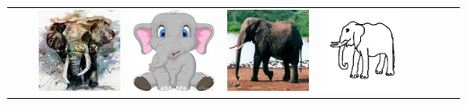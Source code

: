 \begin{table}[htbp]
\begin{tabularx}{\textwidth}{lcYYYYYYYY}
       & & \includegraphics[height=\imagequadsize, width=\imagequadsize]{Figures/Chapter2/PACS/elephant_1.jpg} & \includegraphics[height=\imagequadsize, width=\imagequadsize]{Figures/Chapter2/PACS/elephant_2.jpg} & \includegraphics[height=\imagequadsize, width=\imagequadsize]{Figures/Chapter2/PACS/elephant_3.jpg} & \includegraphics[height=\imagequadsize, width=\imagequadsize]{Figures/Chapter2/PACS/elephant_4.png} & &  & & \\

\end{tabularx}
\end{table}
